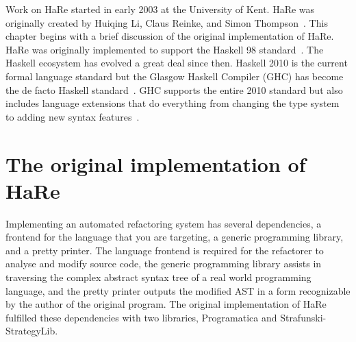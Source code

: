 

Work on HaRe started in early 2003 at the University of Kent. HaRe was originally created by Huiqing Li, Claus Reinke, and Simon Thompson~\citep{refacWebsite}. This chapter begins with a brief discussion of the original implementation of HaRe. HaRe was originally implemented to support the Haskell 98 standard~\citep{huiqingThesis}. The Haskell ecosystem has evolved a great deal since then. Haskell 2010 is the current formal language standard but the Glasgow Haskell Compiler (GHC) has become the de facto Haskell standard~\citep{refacTools}. GHC supports the entire 2010 standard but also includes language extensions that do everything from changing the type system to adding new syntax features~\citep{langExts}.



\section{The original implementation of HaRe}

Implementing an automated refactoring system has several dependencies, a frontend for the language that you are targeting, a generic programming library, and a pretty printer. The language frontend is required for the refactorer to analyse and modify source code, the generic programming library assists in traversing the complex abstract syntax tree of a real world programming language, and the pretty printer outputs the modified AST in a form recognizable by the author of the original program. The original implementation of HaRe fulfilled these dependencies with two libraries, Programatica and Strafunski-StrategyLib. 

